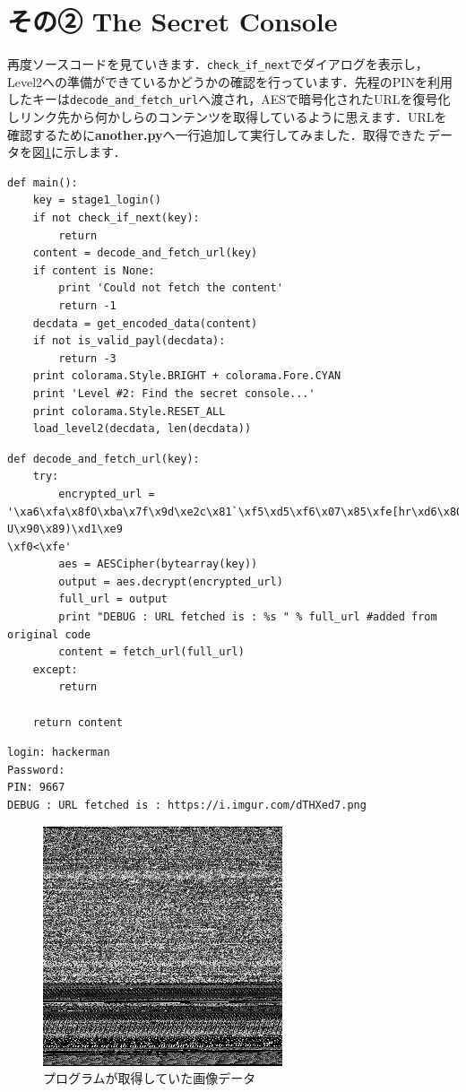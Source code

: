 \section{その② The Secret Console}
再度ソースコードを見ていきます．\texttt{check\_if\_next}でダイアログを表示し，Level2への準備ができているかどうかの確認を行っています．先程のPINを利用したキーは\texttt{decode\_and\_fetch\_url}へ渡され，AESで暗号化されたURLを復号化しリンク先から何かしらのコンテンツを取得しているように思えます．URLを確認するために\textbf{another.py}へ一行追加して実行してみました．取得できた\faFileImageO \,データを図\ref{fig:decrypt_url_data}に示します．
\begin{tcolorbox}[sharp corners, left=2mm]\scriptsize
\begin{verbatim}
def main():
    key = stage1_login()
    if not check_if_next(key):
        return
    content = decode_and_fetch_url(key)
    if content is None:
        print 'Could not fetch the content'
        return -1
    decdata = get_encoded_data(content)
    if not is_valid_payl(decdata):
        return -3
    print colorama.Style.BRIGHT + colorama.Fore.CYAN
    print 'Level #2: Find the secret console...'
    print colorama.Style.RESET_ALL
    load_level2(decdata, len(decdata))
\end{verbatim}
\end{tcolorbox}
\begin{tcolorbox}[sharp corners, left=2mm]\scriptsize
\begin{verbatim}
def decode_and_fetch_url(key):
    try:
        encrypted_url = 
'\xa6\xfa\x8fO\xba\x7f\x9d\xe2c\x81`\xf5\xd5\xf6\x07\x85\xfe[hr\xd6\x80?U\x90\x89)\xd1\xe9
\xf0<\xfe'
        aes = AESCipher(bytearray(key))
        output = aes.decrypt(encrypted_url)
        full_url = output
        print "DEBUG : URL fetched is : %s " % full_url #added from original code
        content = fetch_url(full_url)
    except:
        return

    return content
\end{verbatim}
\end{tcolorbox}
\begin{tcolorbox}[sharp corners, left=2mm]\scriptsize
\begin{verbatim}
login: hackerman
Password:
PIN: 9667
DEBUG : URL fetched is : https://i.imgur.com/dTHXed7.png
\end{verbatim}
\end{tcolorbox}
\begin{figure}[htb]
    \centering
    \includegraphics[width=0.4\linewidth]{./assets/takuzoo3868asset/dTHXed7_gray.png}
    \caption{プログラムが取得していた画像データ}
    \label{fig:decrypt_url_data}
\end{figure}
